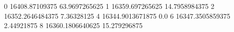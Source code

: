 0 16408.87109375 63.9697265625
1 16359.697265625 14.7958984375
2 16352.2646484375 7.36328125
4 16344.9013671875 0.0
6 16347.3505859375 2.44921875
8 16360.1806640625 15.279296875
